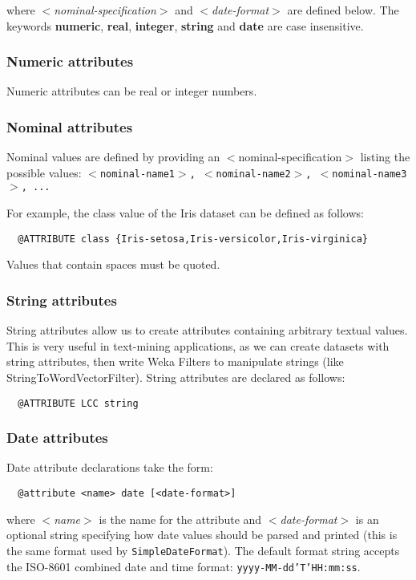 where \textit{$<$nominal-specification$>$} and \textit{$<$date-format$>$} are defined below. The keywords \textbf{numeric}, \textbf{real}, \textbf{integer}, \textbf{string} and \textbf{date} are case insensitive.


\subsubsection*{Numeric attributes}
Numeric attributes can be real or integer numbers. 


\subsubsection*{Nominal attributes}
Nominal values are defined by providing an $<$nominal-specification$>$ listing the possible values: \texttt{{$<$nominal-name1$>$, $<$nominal-name2$>$, $<$nominal-name3$>$, ...}}

For example, the class value of the Iris dataset can be defined as follows:

\begin{verbatim}
  @ATTRIBUTE class {Iris-setosa,Iris-versicolor,Iris-virginica}
\end{verbatim}

Values that contain spaces must be quoted. 


\subsubsection*{String attributes}
String attributes allow us to create attributes containing arbitrary textual values. This is very useful in text-mining applications, as we can create datasets with string attributes, then write Weka Filters to manipulate strings (like StringToWordVectorFilter). String attributes are declared as follows:

\begin{verbatim}
  @ATTRIBUTE LCC string
\end{verbatim}


\subsubsection*{Date attributes}
Date attribute declarations take the form:

\begin{verbatim}
  @attribute <name> date [<date-format>]
\end{verbatim}

where \textit{$<$name$>$} is the name for the attribute and \textit{$<$date-format$>$} is an optional string specifying how date values should be parsed and printed (this is the same format used by \texttt{SimpleDateFormat}). The default format string accepts the ISO-8601 combined date and time format: \texttt{yyyy-MM-dd'T'HH:mm:ss}.

